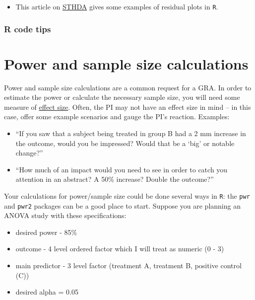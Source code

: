 \documentclass[
]{book}
\providecommand{\tightlist}{%
  \setlength{\itemsep}{0pt}\setlength{\parskip}{0pt}}
\begin{document}
\begin{itemize}
\tightlist
\item
  This article on \href{http://www.sthda.com/english/articles/39-regression-model-diagnostics/161-linear-regression-assumptions-and-diagnostics-in-r-essentials/}{STHDA} gives some examples of residual plots in \texttt{R}.
\end{itemize}

\hypertarget{r-code-tips-1}{%
\subsection{R code tips}\label{r-code-tips-1}}

\hypertarget{power-and-sample-size-calculations}{%
\chapter{Power and sample size calculations}\label{power-and-sample-size-calculations}}

Power and sample size calculations are a common request for a GRA. In order to estimate the power or calculate the necessary sample size, you will need some measure of \href{https://en.wikipedia.org/wiki/Effect_size}{effect size}. Often, the PI may not have an effect size in mind -- in this case, offer some example scenarios and gauge the PI's reaction. Examples:

\begin{itemize}
\tightlist
\item
  ``If you saw that a subject being treated in group B had a 2 mm increase in the outcome, would you be impressed? Would that be a `big' or notable change?''
\item
  ``How much of an impact would you need to see in order to catch you attention in an abstract? A 50\% increase? Double the outcome?''
\end{itemize}

Your calculations for power/sample size could be done several ways in \texttt{R}: the \texttt{pwr} and \texttt{pwr2} packages can be a good place to start. Suppose you are planning an ANOVA study with these specifications:

\begin{itemize}
\tightlist
\item
  desired power - 85\%
\item
  outcome - 4 level ordered factor which I will treat as numeric (0 - 3)
\item
  main predictor - 3 level factor (treatment A, treatment B, positive control (C))
\item
  desired alpha = 0.05
\end{itemize}
\end{document}
